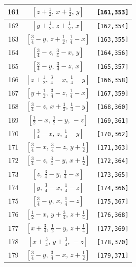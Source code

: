 \documentclass[fleqn,8pt]{jsarticle}
\begin{document}
\begin{longtable}{ccc}
161 & $\left[ z + \frac{1}{2},\, x + \frac{1}{2},\, y \right]$ & {\tt [161,353]} \\ \hline
162 & $\left[ y + \frac{1}{2},\, z + \frac{1}{2},\, x \right]$ & {\tt [162,354]} \\ \hline
163 & $\left[ \frac{3}{4} - y,\, z + \frac{1}{2},\, \frac{1}{4} - x \right]$ & {\tt [163,355]} \\ \hline
164 & $\left[ \frac{3}{4} - z,\, \frac{3}{4} - x,\, y \right]$ & {\tt [164,356]} \\ \hline
165 & $\left[ \frac{3}{4} - y,\, \frac{3}{4} - z,\, x \right]$ & {\tt [165,357]} \\ \hline
166 & $\left[ z + \frac{1}{2},\, \frac{3}{4} - x,\, \frac{1}{4} - y \right]$ & {\tt [166,358]} \\ \hline
167 & $\left[ y + \frac{1}{2},\, \frac{3}{4} - z,\, \frac{1}{4} - x \right]$ & {\tt [167,359]} \\ \hline
168 & $\left[ \frac{3}{4} - z,\, x + \frac{1}{2},\, \frac{1}{4} - y \right]$ & {\tt [168,360]} \\ \hline
169 & $\left[ \frac{1}{2} - x,\, \frac{1}{2} - y,\, - z \right]$ & {\tt [169,361]} \\ \hline
170 & $\left[ \frac{3}{4} - x,\, z,\, \frac{1}{4} - y \right]$ & {\tt [170,362]} \\ \hline
171 & $\left[ \frac{3}{4} - x,\, \frac{3}{4} - z,\, y + \frac{1}{2} \right]$ & {\tt [171,363]} \\ \hline
172 & $\left[ \frac{3}{4} - z,\, \frac{3}{4} - y,\, x + \frac{1}{2} \right]$ & {\tt [172,364]} \\ \hline
173 & $\left[ z,\, \frac{3}{4} - y,\, \frac{1}{4} - x \right]$ & {\tt [173,365]} \\ \hline
174 & $\left[ y,\, \frac{3}{4} - x,\, \frac{1}{4} - z \right]$ & {\tt [174,366]} \\ \hline
175 & $\left[ \frac{3}{4} - y,\, x,\, \frac{1}{4} - z \right]$ & {\tt [175,367]} \\ \hline
176 & $\left[ \frac{1}{2} - x,\, y + \frac{3}{4},\, z + \frac{1}{4} \right]$ & {\tt [176,368]} \\ \hline
177 & $\left[ x + \frac{3}{4},\, \frac{1}{2} - y,\, z + \frac{1}{4} \right]$ & {\tt [177,369]} \\ \hline
178 & $\left[ x + \frac{3}{4},\, y + \frac{3}{4},\, - z \right]$ & {\tt [178,370]} \\ \hline
179 & $\left[ \frac{3}{4} - y,\, \frac{3}{4} - x,\, z + \frac{1}{2} \right]$ & {\tt [179,371]} \\ \hline

\end{longtable}
\end{document}
